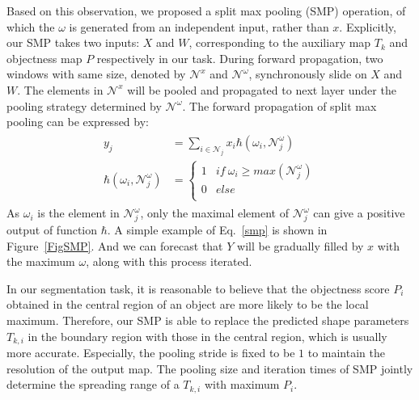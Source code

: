 Based on this observation, we proposed a split max pooling (SMP) operation, of which the $\omega$ is generated from an independent input, rather than $x$.
%
Explicitly, our SMP takes two inputs: $X$ and $W$, corresponding to the auxiliary map $T_k$ and objectness map $P$ respectively in our task.
%
During forward propagation, two windows with same size, denoted by $\mathcal{N}^{x}$ and $\mathcal{N}^{\omega}$, synchronously slide on $X$ and $W$.
The elements in $\mathcal{N}^{x}$ will be pooled and propagated to next layer under the pooling strategy determined by $\mathcal{N}^{\omega}$.
The forward propagation of split max pooling can be expressed by:
\begin{eqnarray}\label{smp}
\begin{aligned}
y_{j} &= \sum_{i\in \mathcal{N}_{j}}x_{i}\hbar(\omega_{i},\mathcal{N}^{\omega}_{j})\\
\hbar(\omega_{i},\mathcal{N}^{\omega}_{j})&=\left\{\begin{array}{cc}
1&if~\omega_{i}\geq max(\mathcal{N}^{\omega}_{j})\\
0&else\\
\end{array}\right.
\end{aligned}
\end{eqnarray}
%
As $\omega_i$ is the element in $\mathcal{N}^{\omega}_{j}$, only the maximal element of $\mathcal{N}^{\omega}_{j}$ can give a positive output of function $\hbar$.
A simple example of Eq.~\ref{smp} is shown in Figure~\ref{FigSMP}.
And we can forecast that $Y$ will be gradually filled by $x$ with the maximum $\omega$, along with this process iterated.

In our segmentation task, it is reasonable to believe that the objectness score $P_i$ obtained in the central region of an object are more likely to be the local maximum.
Therefore, our SMP is able to replace the predicted shape parameters $T_{k,i}$ in the boundary region with those in the central region, which is usually more accurate.
Especially, the pooling stride is fixed to be $1$ to maintain the resolution of the output map. 
The pooling size and iteration times of SMP jointly determine the spreading range of a $T_{k,i}$ with maximum $P_i$.

